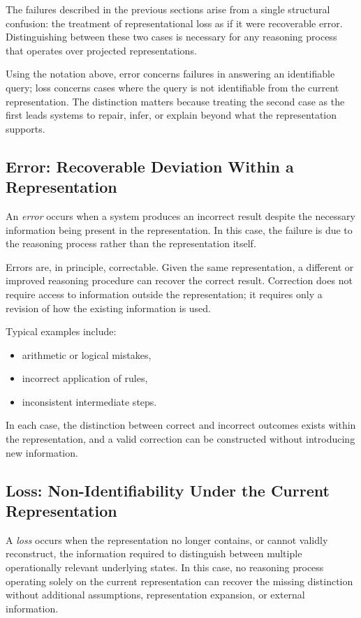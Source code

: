 \documentclass[11pt]{article}
\begin{document}
The failures described in the previous sections arise from a single structural confusion: the treatment of representational loss as if it were recoverable error. Distinguishing between these two cases is necessary for any reasoning process that operates over projected representations.

Using the notation above, error concerns failures in answering an identifiable query; loss concerns cases where the query is not identifiable from the current representation. The distinction matters because treating the second case as the first leads systems to repair, infer, or explain beyond what the representation supports.

\subsection{Error: Recoverable Deviation Within a Representation}

An \emph{error} occurs when a system produces an incorrect result despite the necessary information being present in the representation. In this case, the failure is due to the reasoning process rather than the representation itself.

Errors are, in principle, correctable. Given the same representation, a different or improved reasoning procedure can recover the correct result. Correction does not require access to information outside the representation; it requires only a revision of how the existing information is used.

Typical examples include:
\begin{itemize}[leftmargin=1.5em]
    \item arithmetic or logical mistakes,
    \item incorrect application of rules,
    \item inconsistent intermediate steps.
\end{itemize}

In each case, the distinction between correct and incorrect outcomes exists within the representation, and a valid correction can be constructed without introducing new information.

\subsection{Loss: Non-Identifiability Under the Current Representation}

A \emph{loss} occurs when the representation no longer contains, or cannot validly reconstruct, the information required to distinguish between multiple operationally relevant underlying states. In this case, no reasoning process operating solely on the current representation can recover the missing distinction without additional assumptions, representation expansion, or external information.
\end{document}
